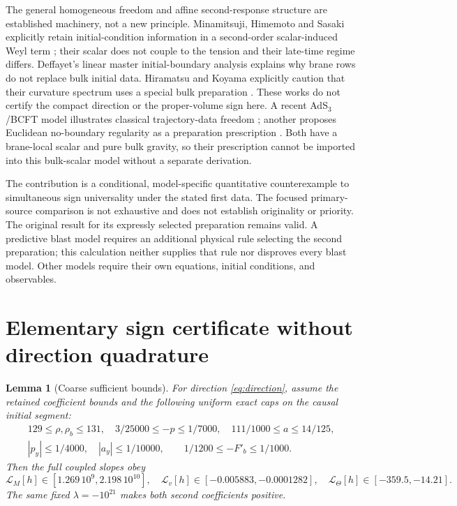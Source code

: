 \documentclass[11pt]{article}
\newtheorem{lemma}{Lemma}
\begin{document}
The general homogeneous freedom and affine second-response structure are
established machinery, not a new principle. Minamitsuji, Himemoto and
Sasaki explicitly retain initial-condition information in a second-order
scalar-induced Weyl term \cite{Minamitsuji}; their scalar does not couple
to the tension and their late-time regime differs. Deffayet's linear
master initial-boundary analysis \cite{Deffayet} explains why brane rows
do not replace bulk initial data. Hiramatsu and Koyama explicitly caution
that their curvature spectrum uses a special bulk preparation
\cite{Hiramatsu}. These works do not certify the compact direction or
the proper-volume sign here. A recent AdS$_3$/BCFT model illustrates
classical trajectory-data freedom \cite{Fujiki2025}; another proposes
Euclidean no-boundary regularity as a preparation prescription
\cite{Fujiki2026}. Both have a brane-local scalar and pure bulk gravity,
so their prescription cannot be imported into this bulk-scalar model
without a separate derivation.

The contribution is a conditional, model-specific quantitative
counterexample to simultaneous sign universality under the stated first
data. The focused primary-source comparison is not exhaustive and does
not establish originality or priority. The original result for its
expressly selected preparation remains valid. A predictive blast model
requires an additional physical rule selecting the second preparation;
this calculation neither supplies that rule nor disproves every blast
model. Other models require their own equations, initial conditions,
and observables.

\appendix
\section{Elementary sign certificate without direction quadrature}
\label{app:coarse}

\begin{lemma}[Coarse sufficient bounds]
For direction \eqref{eq:direction}, assume the retained coefficient
bounds and the following uniform exact caps on the causal initial segment:
\begin{gather}
 129\le\rho,\rho_b\le131,\quad
 3/25000\le-p\le1/7000,\quad 111/1000\le a\le14/125,\nonumber\\
 |p_y|\le1/4000,\quad |a_y|\le1/10000,\qquad
 1/1200\le-F'_b\le1/1000. \label{eq:coarsecaps}
\end{gather}
Then the full coupled slopes obey
\begin{equation}
 \mathcal L_M[h]\in[1.269\,10^9,2.198\,10^{10}],\quad
 \mathcal L_v[h]\in[-0.005883,-0.0001282],\quad
 \mathcal L_\Theta[h]\in[-359.5,-14.21]. \label{eq:coarseslopes}
\end{equation}
The same fixed $\lambda=-10^{21}$ makes both second coefficients positive.
\end{lemma}
\end{document}
